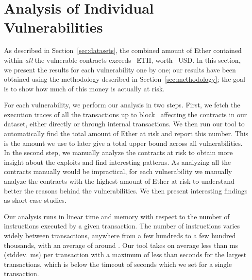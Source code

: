


\section{Analysis of Individual Vulnerabilities}
\label{sec:analysis}

As described in Section~\ref{sec:datasets}, the combined amount of Ether contained within \emph{all} the vulnerable contracts exceeds~ ETH, worth~ USD. In this section, we present the results for each vulnerability one by one; our results have been obtained using the methodology described in Section~\ref{sec:methodology}; the goal is to show how much of this money is actually at risk.

For each vulnerability, we perform our analysis in two steps.
First, we fetch the execution traces of all the transactions up to block~ affecting the contracts in our dataset, either directly or through internal transactions. We then run our tool to automatically find the total amount of Ether at risk and report this number.
This is the amount we use to later give a total upper bound across all vulnerabilities.
In the second step, we manually analyze the contracts at risk to obtain more insight about the exploits and find interesting patterns.
As analyzing all the contracts manually would be impractical, for each vulnerability we manually analyze the contracts with the highest amount of Ether at risk to understand better the reasons behind the vulnerabilities.
We then present interesting findings as short case studies.

 Our analysis runs in linear time and memory with respect to the number of instructions executed by a given transaction. The number of instructions varies widely between transactions, anywhere from a few hundreds to a few hundred thousands, with an average of around . Our tool takes on average less than ms (stddev. ms) per transaction with a maximum of less than  seconds for the largest transactions, which is below the timeout of  seconds which we set for a single transaction.



